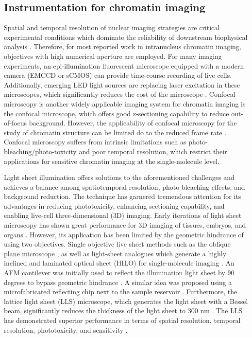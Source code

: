 \subsection{Instrumentation for chromatin imaging}

Spatial and temporal resolution of nuclear imaging strategies are critical experimental conditions which dominate the reliability of downstream biophysical analysis \parencite{Burov2013}. Therefore, for most reported work in intranucleus chromatin imaging, objectives with high numerical aperture are employed. For many imaging experiments, an epi-illumination fluorescent microscope equipped with a modern camera (EMCCD or sCMOS) can provide time-course recording of live cells. Additionally, emerging LED light sources are replacing laser excitation in these microscopes, which significantly reduces the cost of the microscope \parencite{Albeanu2008,Hattori2009,Zheng2013}. Confocal microscopy is another widely applicable imaging system for chromatin imaging is the confocal microscope, which offers good z-sectioning capability to reduce out-of-focus background. However, the applicability of confocal microscopy for the study of chromatin structure can be limited do to the reduced frame rate \parencite{Shukron2019}. Confocal microscopy suffers from intrinsic limitations such as photo-bleaching/photo-toxicity and poor temporal resolution, which restrict their applications for sensitive chromatin imaging at the single-molecule level.

Light sheet illumination offers solutions to the aforementioned challenges and achieves a balance among spatiotemporal resolution, photo-bleaching effects, and background reduction. The technique has garnered tremendous attention for its advantages in reducing phototoxicity, enhancing sectioning capability, and enabling live-cell three-dimensional (3D) imaging. Early iterations of light sheet microscopy has shown great performance for 3D imaging of tissues, embryos, and organs \parencite{Keller2015,Keller2010,Keller2008,Tomer2011}. However, its application has been limited by the geometric hindrance of using two objectives. Single objective live sheet methods such as the oblique plane microscope \parencite{Sopoznik2020}, as well as light-sheet analogues which generate a highly inclined and laminated optical sheet (HILO) for single-molecule imaging \parencite{Tokunaga2008}. An AFM cantilever was initially used to reflect the illumination light sheet by 90 degrees to bypass geometric hindrance \parencite{Gebhardt2013}. A similar idea was proposed using a microfabricated reflecting chip next to the sample reservoir \parencite{Galland2015}. Furthermore, the lattice light sheet (LLS) microscope, which generates the light sheet with a Bessel beam, significantly reduces the thickness of the light sheet to 300 nm \parencite{Chen2014}. The LLS has demonstrated superior performance in terms of spatial resolution, temporal resolution, phototoxicity, and sensitivity \parencite{Gao2019}.


